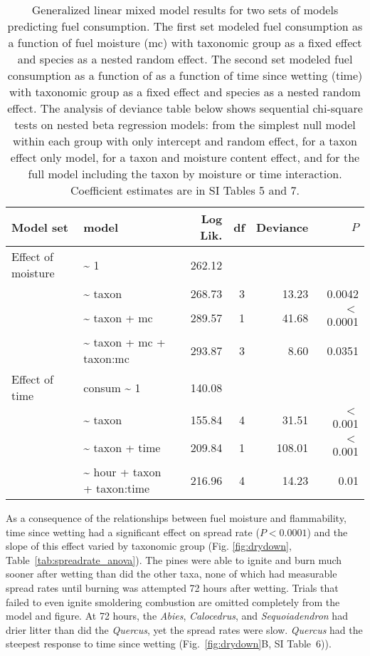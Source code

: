 \documentclass[letterpaper,12pt]{article}
\begin{document}
\begin{table}
  \caption{Generalized linear mixed model results for two sets of models
    predicting fuel consumption. The first set modeled fuel consumption as a
    function of fuel moisture (mc) with taxonomic group as a fixed effect and
    species as a nested random effect. The second set modeled fuel consumption
    as a function of as a function of time since wetting (time) with taxonomic
    group as a fixed effect and species as a nested random effect. The analysis
    of deviance table below shows sequential chi-square tests on nested beta
    regression models: from the simplest null model within each group with only
    intercept and random effect, for a taxon effect only model, for a taxon and
    moisture content effect, and for the full model including the taxon by
    moisture or time interaction. Coefficient estimates are in SI Tables 5 and
    7.}
  \label{tab:consume_anova}
  \centering

  \begin{tabular}{llrrrr}
\toprule
Model set & model & Log Lik. & df & Deviance & $P$ \\ 
\midrule
  Effect of moisture &   \~{} 1 & 262.12 &  &  &  \\ 
   &  \~{} taxon & 268.73 & 3 & 13.23 & 0.0042 \\ 
   & \~{} taxon + mc & 289.57 & 1 & 41.68 & $<$ 0.0001 \\ 
   & \~{} taxon + mc + taxon:mc & 293.87 & 3 & 8.60 & 0.0351 \\ 
\midrule
Effect of time &  consum \~{} 1 & 140.08 &  &  &  \\ 
 & \~{} taxon & 155.84 & 4 & 31.51 & $<$ 0.001 \\ 
 & \~{} taxon + time & 209.84 & 1 & 108.01 & $<$ 0.001 \\ 
 & \~{} hour + taxon + taxon:time & 216.96 & 4 & 14.23 & 0.01 \\ 
    \bottomrule
    \end{tabular}
\end{table}


As a consequence of the relationships between fuel moisture and flammability,
time since wetting had a significant effect on spread rate ($P < 0.0001$) and
the slope of this effect varied by taxonomic group (Fig. \ref{fig:drydown},
Table~\ref{tab:spreadrate_anova}). The pines were able to ignite and burn much
sooner after wetting than did the other taxa, none of which had measurable
spread rates until burning was attempted 72 hours after wetting. Trials that
failed to even ignite smoldering combustion are omitted completely from the
model and figure. At 72 hours, the \emph{Abies}, \emph{Calocedrus}, and
\emph{Sequoiadendron} had drier litter than did the \emph{Quercus}, yet the
spread rates were slow. \emph{Quercus} had the steepest response to time since
wetting (Fig.~\ref{fig:drydown}B, SI Table~6)).
\end{document}
